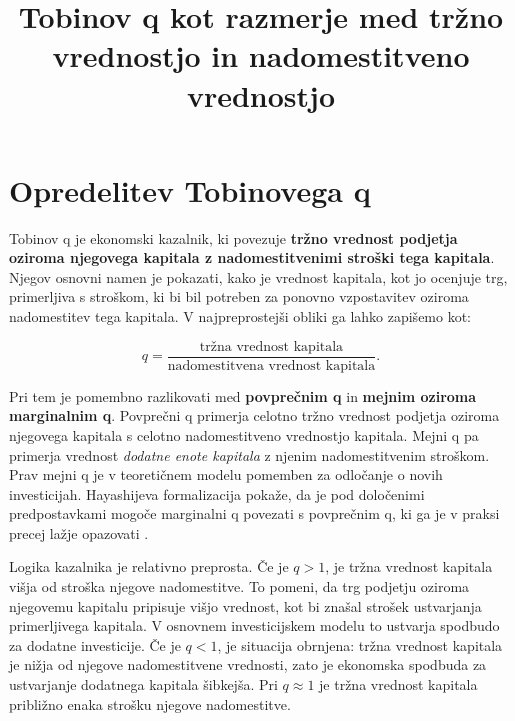 \documentclass[12pt,a4paper]{article}
\title{\textbf{Tobinov q kot razmerje med tržno vrednostjo in nadomestitveno vrednostjo}}
\author{}
\date{}
\begin{document}
\maketitle




\section{Opredelitev Tobinovega q}




Tobinov q je ekonomski kazalnik, ki povezuje \textbf{tržno vrednost podjetja oziroma njegovega kapitala z nadomestitvenimi stroški tega kapitala}. Njegov osnovni namen je pokazati, kako je vrednost kapitala, kot jo ocenjuje trg, primerljiva s stroškom, ki bi bil potreben za ponovno vzpostavitev oziroma nadomestitev tega kapitala. V najpreprostejši obliki ga lahko zapišemo kot:



\begin{equation}
q = \frac{\text{tržna vrednost kapitala}}{\text{nadomestitvena vrednost kapitala}}.
\end{equation}



Pri tem je pomembno razlikovati med \textbf{povprečnim q} in \textbf{mejnim oziroma marginalnim q}. Povprečni q primerja celotno tržno vrednost podjetja oziroma njegovega kapitala s celotno nadomestitveno vrednostjo kapitala. Mejni q pa primerja vrednost \emph{dodatne enote kapitala} z njenim nadomestitvenim stroškom. Prav mejni q je v teoretičnem modelu pomemben za odločanje o novih investicijah. Hayashijeva formalizacija pokaže, da je pod določenimi predpostavkami mogoče marginalni q povezati s povprečnim q, ki ga je v praksi precej lažje opazovati \citep{AndreiMannMoyen2017,PetersTaylor2016}.



Logika kazalnika je relativno preprosta. Če je $q>1$, je tržna vrednost kapitala višja od stroška njegove nadomestitve. To pomeni, da trg podjetju oziroma njegovemu kapitalu pripisuje višjo vrednost, kot bi znašal strošek ustvarjanja primerljivega kapitala. V osnovnem investicijskem modelu to ustvarja spodbudo za dodatne investicije. Če je $q<1$, je situacija obrnjena: tržna vrednost kapitala je nižja od njegove nadomestitvene vrednosti, zato je ekonomska spodbuda za ustvarjanje dodatnega kapitala šibkejša. Pri $q \approx 1$ je tržna vrednost kapitala približno enaka strošku njegove nadomestitve.
\end{document}
